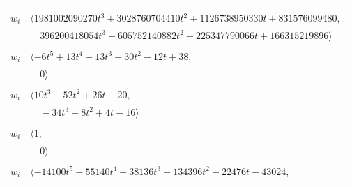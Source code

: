 \documentclass[11pt]{article}
\begin{document}
\begin{longtable}{@{}ll@{}}
\addlinespace[2pt]
\multicolumn{2}{@{}p{0.97\textwidth}@{}}{$i=55$, $D_i=1$, $\rho_{ij}$: $6{:}2, \allowbreak 9{:}1, \allowbreak 13{:}2, \allowbreak 14{:}1, \allowbreak 15{:}1, \allowbreak 20{:}1, \allowbreak 25{:}2, \allowbreak 26{:}1, \allowbreak 27{:}2, \allowbreak 32{:}1, \allowbreak 33{:}1, \allowbreak 34{:}2, \allowbreak 41{:}2, \allowbreak 42{:}1, \allowbreak 57{:}1, \allowbreak 65{:}1, \allowbreak 68{:}2, \allowbreak 71{:}1, \allowbreak 72{:}2, \allowbreak 73{:}2, \allowbreak 74{:}2, \allowbreak 79{:}1, \allowbreak 82{:}2, \allowbreak 93{:}2$}\\
$w_i$ & $\langle 1981002090270t^{3}+3028760704410t^{2}+1126738950330t+831576099480,$\\
 & $\quad 396200418054t^{3}+605752140882t^{2}+225347790066t+166315219896\rangle$\\
\addlinespace[2pt]
\multicolumn{2}{@{}p{0.97\textwidth}@{}}{$i=56$, $D_i=1$, $\rho_{ij}$: $13{:}1, \allowbreak 18{:}1, \allowbreak 19{:}2, \allowbreak 24{:}1, \allowbreak 29{:}1, \allowbreak 62{:}1, \allowbreak 71{:}2, \allowbreak 78{:}2, \allowbreak 81{:}2, \allowbreak 96{:}2$}\\
$w_i$ & $\langle -6t^{5}+13t^{4}+13t^{3}-30t^{2}-12t+38,$\\
 & $\quad 0\rangle$\\
\addlinespace[2pt]
\multicolumn{2}{@{}p{0.97\textwidth}@{}}{$i=57$, $D_i=1$, $\rho_{ij}$: $2{:}2, \allowbreak 3{:}2, \allowbreak 5{:}1, \allowbreak 16{:}2, \allowbreak 22{:}1, \allowbreak 25{:}1, \allowbreak 34{:}1, \allowbreak 39{:}1, \allowbreak 55{:}2, \allowbreak 59{:}1$}\\
$w_i$ & $\langle 10t^{3}-52t^{2}+26t-20,$\\
 & $\quad -34t^{3}-8t^{2}+4t-16\rangle$\\
\addlinespace[2pt]
\multicolumn{2}{@{}p{0.97\textwidth}@{}}{$i=58$, $D_i=1$, $\rho_{ij}$: $--$}\\
$w_i$ & $\langle 1,$\\
 & $\quad 0\rangle$\\
\addlinespace[2pt]
\multicolumn{2}{@{}p{0.97\textwidth}@{}}{$i=59$, $D_i=31$, $\rho_{ij}$: $2{:}2, \allowbreak 4{:}1, \allowbreak 9{:}1, \allowbreak 10{:}1, \allowbreak 11{:}2, \allowbreak 13{:}1, \allowbreak 14{:}2, \allowbreak 15{:}2, \allowbreak 16{:}2, \allowbreak 21{:}2, \allowbreak 22{:}2, \allowbreak 33{:}1, \allowbreak 40{:}1, \allowbreak 57{:}2, \allowbreak 61{:}2, \allowbreak 62{:}1, \allowbreak 63{:}1$}\\
$w_i$ & $\langle -14100t^{5}-55140t^{4}+38136t^{3}+134396t^{2}-22476t-43024,$\\

\end{longtable}
\end{document}
